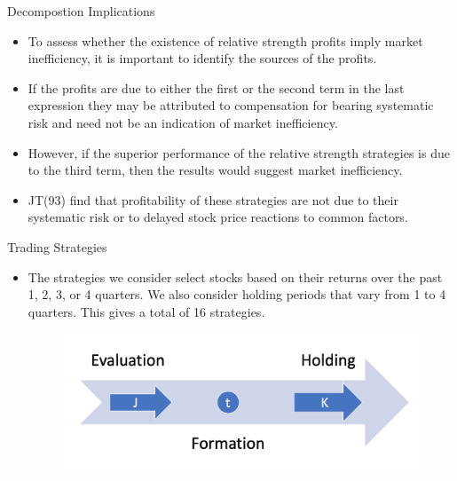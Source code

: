 \documentclass{beamer}
\begin{document}
\begin{frame}{Decompostion Implications}
    \begin{itemize}
        \item To assess whether the existence of relative strength profits imply market inefficiency, it is important to identify the sources of the profits.
        \item If the profits are due to either the first or the second term in the last expression they may be attributed to compensation for bearing systematic risk and need not be an indication of market inefficiency.
        \item However, if the superior performance of the relative strength strategies is due to the third term, then the results would suggest market inefficiency.
        \item JT(93) find that profitability of these strategies are not due to their systematic risk or to delayed stock price reactions to common factors.
    \end{itemize}
\end{frame}

\begin{frame}{Trading Strategies}
    \begin{itemize}
        \item The strategies we consider select stocks based on their returns over the past 1, 2, 3, or 4 quarters. We also consider holding periods that vary from 1 to 4 quarters. This gives a total of 16 strategies.
              \begin{figure}
                  \centering
                  \includegraphics[scale=.4]{strategies.png}
              \end{figure}
    \end{itemize}
\end{frame}
\end{document}
